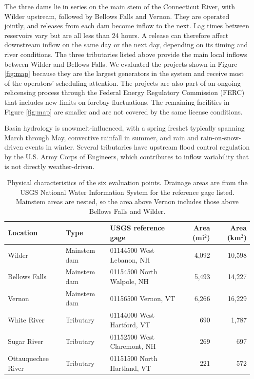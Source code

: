 \documentclass[MLA]{USG} %
\begin{document}
The three dams lie in series on the main stem of the Connecticut River, with Wilder upstream, followed by Bellows Falls and Vernon. They are operated jointly, and releases from each dam become inflow to the next. Lag times between reservoirs vary but are all less than 24 hours. A release can therefore affect downstream inflow on the same day or the next day, depending on its timing and river conditions. The three tributaries listed above provide the main local inflows between Wilder and Bellows Falls. We evaluated the projects shown in Figure \ref{fig:map} because they are the largest generators in the system and receive most of the operators' scheduling attention. The projects are also part of an ongoing relicensing process through the Federal Energy Regulatory Commission (FERC) that includes new limits on forebay fluctuations. The remaining facilities in Figure \ref{fig:map} are smaller and are not covered by the same license conditions.

Basin hydrology is snowmelt-influenced, with a spring freshet typically spanning March through May, convective rainfall in summer, and rain and rain-on-snow-driven events in winter. Several tributaries have upstream flood control regulation by the U.S. Army Corps of Engineers, which contributes to inflow variability that is not directly weather-driven.

\begin{table}[ht]
\centering
\caption{Physical characteristics of the six evaluation points. Drainage areas are from the USGS National Water Information System for the reference gage listed. Mainstem areas are nested, so the area above Vernon includes those above Bellows Falls and Wilder.}\label{tab:basin}
\begin{tabular}{lllrr}
  \hline
Location & Type & USGS reference gage & Area (mi$^2$) & Area (km$^2$) \\
  \hline
Wilder             & Mainstem dam & 01144500 West Lebanon, NH   & 4,092 & 10,598 \\
Bellows Falls      & Mainstem dam & 01154500 North Walpole, NH  & 5,493 & 14,227 \\
Vernon             & Mainstem dam & 01156500 Vernon, VT         & 6,266 & 16,229 \\
White River        & Tributary    & 01144000 West Hartford, VT  &   690 &  1,787 \\
Sugar River        & Tributary    & 01152500 West Claremont, NH &   269 &    697 \\
Ottauquechee River & Tributary    & 01151500 North Hartland, VT &   221 &    572 \\
   \hline
\end{tabular}
\end{table}
\end{document}
